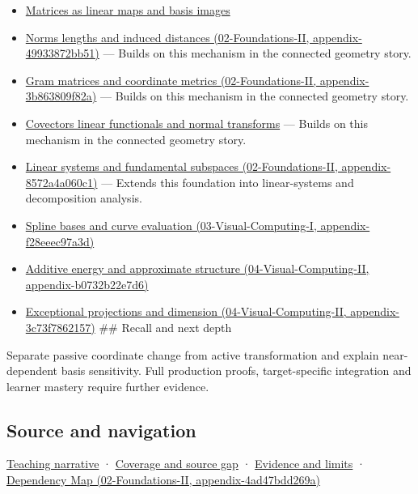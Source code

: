 \begin{itemize}
\item
  \hyperref[appendix-bd39c3bf5d64]{Matrices as linear maps and basis images}
\item
  \href{../02-Foundations-II/main.pdf\#nameddest=appendix-49933872bb51}{Norms lengths and induced distances (02-Foundations-II, appendix-49933872bb51)} --- Builds on this mechanism in the connected geometry story.
\item
  \href{../02-Foundations-II/main.pdf\#nameddest=appendix-3b863809f82a}{Gram matrices and coordinate metrics (02-Foundations-II, appendix-3b863809f82a)} --- Builds on this mechanism in the connected geometry story.
\item
  \hyperref[appendix-46da295c6787]{Covectors linear functionals and normal transforms} --- Builds on this mechanism in the connected geometry story.
\item
  \href{../02-Foundations-II/main.pdf\#nameddest=appendix-8572a4a060c1}{Linear systems and fundamental subspaces (02-Foundations-II, appendix-8572a4a060c1)} --- Extends this foundation into linear-systems and decomposition analysis.
\item
  \href{../03-Visual-Computing-I/main.pdf\#nameddest=appendix-f28eeec97a3d}{Spline bases and curve evaluation (03-Visual-Computing-I, appendix-f28eeec97a3d)}
\item
  \href{../04-Visual-Computing-II/main.pdf\#nameddest=appendix-b0732b22e7d6}{Additive energy and approximate structure (04-Visual-Computing-II, appendix-b0732b22e7d6)}
\item
  \href{../04-Visual-Computing-II/main.pdf\#nameddest=appendix-3c73f7862157}{Exceptional projections and dimension (04-Visual-Computing-II, appendix-3c73f7862157)} \#\# Recall and next depth
\end{itemize}

Separate passive coordinate change from active transformation and explain near-dependent basis sensitivity. Full production proofs, target-specific integration and learner mastery require further evidence.

\subsection{Source and navigation}\label{appendix-ce0341f7ea0d-source-and-navigation}

\hyperref[01-foundations-i-ch017-a-basis-is-a-measuring-arrangement-not-the-vector-itself]{Teaching narrative} · \hyperref[appendix-fd090d982a15-phase-6---parts-501-600]{Coverage and source gap} · \hyperref[appendix-a103e7846d21-phase-6---source-analysis-and-verification]{Evidence and limits} · \href{../02-Foundations-II/main.pdf\#nameddest=appendix-4ad47bdd269a}{Dependency Map (02-Foundations-II, appendix-4ad47bdd269a)}
